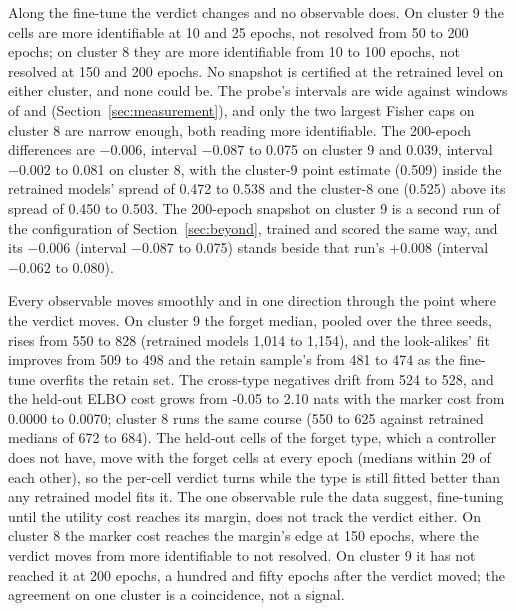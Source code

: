 \documentclass{article}
\begin{document}
Along the fine-tune the verdict changes and no observable does. On cluster 9 the cells are more identifiable at 10 and 25 epochs, not resolved from 50 to 200 epochs; on cluster 8 they are more identifiable from 10 to 100 epochs, not resolved at 150 and 200 epochs. No snapshot is certified at the retrained level on either cluster, and none could be. The probe's intervals are  wide against windows of  and  (Section~\ref{sec:measurement}), and only the two largest Fisher caps on cluster 8 are narrow enough, both reading more identifiable. The 200-epoch differences are $-0.006$, interval $-0.087$ to 0.075 on cluster 9 and 0.039, interval $-0.002$ to 0.081 on cluster 8, with the cluster-9 point estimate (0.509) inside the retrained models' spread of 0.472 to 0.538 and the cluster-8 one (0.525) above its spread of 0.450 to 0.503. The 200-epoch snapshot on cluster 9 is a second run of the configuration of Section~\ref{sec:beyond}, trained and scored the same way, and its $-0.006$ (interval $-0.087$ to 0.075) stands beside that run's $+0.008$ (interval $-0.062$ to 0.080).

Every observable moves smoothly and in one direction through the point where the verdict moves. On cluster 9 the forget median, pooled over the three seeds, rises from 550 to 828 (retrained models 1,014 to 1,154), and the look-alikes' fit improves from 509 to 498 and the retain sample's from 481 to 474 as the fine-tune overfits the retain set. The cross-type negatives drift from 524 to 528, and the held-out ELBO cost grows from -0.05 to 2.10 nats with the marker cost from 0.0000 to 0.0070; cluster 8 runs the same course (550 to 625 against retrained medians of 672 to 684). The held-out cells of the forget type, which a controller does not have, move with the forget cells at every epoch (medians within 29 of each other), so the per-cell verdict turns while the type is still fitted better than any retrained model fits it. The one observable rule the data suggest, fine-tuning until the utility cost reaches its margin, does not track the verdict either. On cluster 8 the marker cost reaches the margin's edge at 150 epochs, where the verdict moves from more identifiable to not resolved. On cluster 9 it has not reached it at 200 epochs, a hundred and fifty epochs after the verdict moved; the agreement on one cluster is a coincidence, not a signal.
\end{document}
